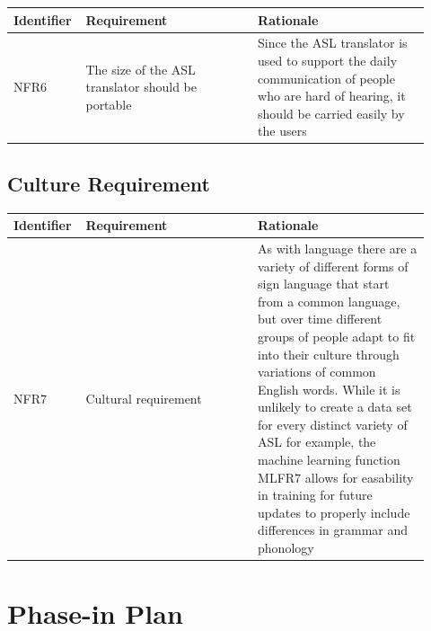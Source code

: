 \documentclass[12pt]{article}
\begin{document}
\renewcommand{\arraystretch}{1.2}
\noindent \begin{tabularx}{\textwidth}{p{0.12\linewidth}|p{0.4\linewidth}|p{0.4\linewidth}}
\toprule
\textbf{Identifier} & \textbf{Requirement} & \textbf{Rationale}\\
\midrule
NFR6
& The size of the ASL translator should be portable
& Since the ASL translator is used to support the daily communication of people who are hard of hearing, it should be carried easily by the users\\
\bottomrule
\end{tabularx}

\subsection{Culture Requirement}

\renewcommand{\arraystretch}{1.2}
\noindent \begin{tabularx}{\textwidth}{p{0.12\linewidth}|p{0.4\linewidth}|p{0.4\linewidth}}
\toprule
\textbf{Identifier} & \textbf{Requirement} & \textbf{Rationale}\\
\midrule
NFR7
& Cultural requirement
& As with language there are a variety of different forms of sign language that start from a common language, but over time different groups of people 
adapt to fit into their culture through variations of common English words. While it is unlikely to create a data set for every distinct variety of ASL for 
example, the machine learning function MLFR7 allows for easability in training for future updates to properly include differences in grammar and phonology\\
\bottomrule
\end{tabularx}



\section{Phase-in Plan}
\end{document}
